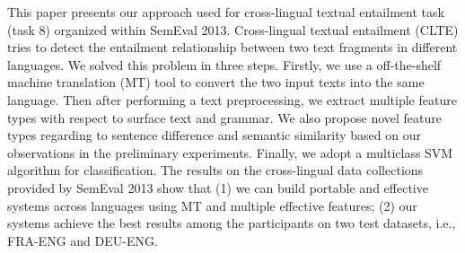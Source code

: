 This paper presents our approach used for cross-lingual textual entailment task (task 8) organized within SemEval 2013. Cross-lingual textual entailment (CLTE)
 tries to detect the entailment relationship between two text fragments in
 different languages. We solved this problem in three steps. Firstly, we use a
 off-the-shelf machine translation (MT) tool to convert the two input texts into
 the same language. Then after performing a text preprocessing, we extract
 multiple feature types with respect to surface text and grammar. We also
 propose novel feature types regarding to sentence difference and semantic
 similarity based on our observations in the preliminary experiments. Finally,
 we adopt a multiclass SVM algorithm for classification. The results on the
 cross-lingual data collections provided by SemEval 2013 show that (1) we can
 build portable and effective systems across languages using MT and multiple
 effective features; (2) our systems achieve the best results among the
 participants on two test datasets, i.e., FRA-ENG and DEU-ENG.


